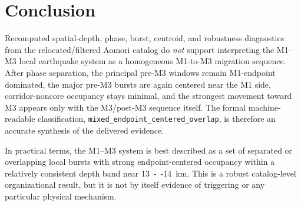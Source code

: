 \documentclass[11pt]{article}
\begin{document}
\section{Conclusion}
Recomputed spatial-depth, phase, burst, centroid, and robustness diagnostics from the relocated/filtered Aomori catalog do \emph{not} support interpreting the M1--M3 local earthquake system as a homogeneous M1-to-M3 migration sequence. After phase separation, the principal pre-M3 windows remain M1-endpoint dominated, the major pre-M3 bursts are again centered near the M1 side, corridor-noncore occupancy stays minimal, and the strongest movement toward M3 appears only with the M3/post-M3 sequence itself. The formal machine-readable classification, \texttt{mixed\_endpoint\_centered\_overlap}, is therefore an accurate synthesis of the delivered evidence.

In practical terms, the M1--M3 system is best described as a set of separated or overlapping local bursts with strong endpoint-centered occupancy within a relatively consistent depth band near \SI{13}{--}\SI{14}{km}. This is a robust catalog-level organizational result, but it is not by itself evidence of triggering or any particular physical mechanism.
\end{document}
